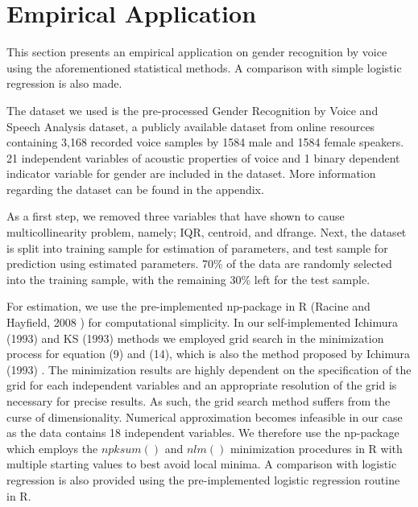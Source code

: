 \section{Empirical Application} %
\label{sec:Empirical Application}

This section presents an empirical application on gender recognition by voice using the aforementioned statistical methods. A comparison with simple logistic regression is also made. 

The dataset we used is the pre-processed Gender Recognition by Voice and Speech Analysis dataset, a publicly available dataset from online resources containing 3,168 recorded voice samples by 1584 male and 1584 female speakers. 21 independent variables of acoustic properties of voice and 1 binary dependent indicator variable for gender are included in the dataset. More information regarding the dataset can be found in the appendix.  

As a first step, we removed three variables that have shown to cause multicollinearity problem,  namely; IQR, centroid, and dfrange. Next, the dataset is split into training sample for estimation of parameters, and test sample for prediction using estimated parameters. 70\% of the data are randomly selected into the training sample, with the remaining 30\% left for the test sample. 

For estimation, we use the pre-implemented np-package in R (Racine and Hayfield, 2008 \cite{[28]}) for computational simplicity. In our self-implemented Ichimura (1993) \cite{[6]} and KS (1993) \cite{[12]} methods we employed grid search in the minimization process for equation (9) and (14), which is also the method proposed by Ichimura (1993) \cite{[6]}. The minimization results are highly dependent on the specification of the grid for each independent variables and an appropriate resolution of the grid is necessary for precise results. As such, the grid search method suffers from the curse of dimensionality. Numerical approximation becomes infeasible in our case as the data contains 18 independent variables. We therefore use the np-package which employs the $npksum()$ and $nlm()$ minimization procedures in R with multiple starting values to best avoid local minima. A comparison with logistic regression is also provided using the pre-implemented logistic regression routine in R.


